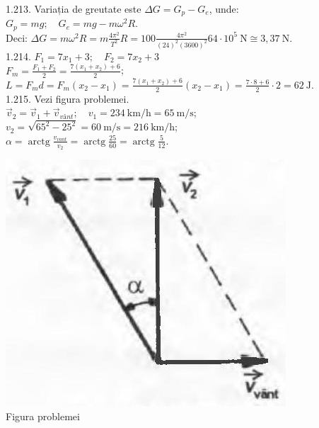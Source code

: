 1.213. Variația de greutate este $\Delta G=G_{p}-G_{e}$, unde:\\ $G_{p}=m g; \quad G_{e}=m g-m \omega^{2} R$.\\ Deci: $\Delta G=m \omega^{2} R=m \frac{4 \pi^{2}}{T^{2}} R=100 \frac{4 \pi^{2}}{(24)^{2}(3600)^{2}} 64 \cdot 10^{5} \mathrm{~N} \cong 3,37 \mathrm{~N}$.\\

1.214. $F_{1}=7 x_{1}+3; \quad F_{2}=7 x_{2}+3$\\ $F_{m}=\frac{F_{1}+F_{2}}{2}=\frac{7\left(x_{1}+x_{2}\right)+6}{2}$;\\ $L=F_{m} d=F_{m}\left(x_{2}-x_{1}\right)=\frac{7\left(x_{1}+x_{2}\right)+6}{2}\left(x_{2}-x_{1}\right)=\frac{7 \cdot 8+6}{2} \cdot 2=62 \mathrm{~J}$.\\

1.215. Vezi figura problemei.\\ $\vec{v}_{2}=\vec{v}_{1}+\vec{v}_{vânt}; \quad v_{1}=234 \mathrm{~km} / \mathrm{h}=65 \mathrm{~m} / \mathrm{s}$;\\ $v_{2}=\sqrt{65^{2}-25^{2}}=60 \mathrm{~m} / \mathrm{s}=216 \mathrm{~km} / \mathrm{h}$;\\ $\alpha=\operatorname{arctg} \frac{v_{v a n t}}{v_{2}}=\operatorname{arctg} \frac{25}{60}=\operatorname{arctg} \frac{5}{12}$.\\ \begin{center} \includegraphics[width=0.4\linewidth]{images/2025_07_01_5b3ff9fa0d508c8e9f17g-245}\\ Figura problemei \end{center}\\

